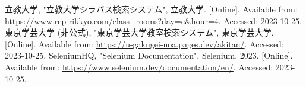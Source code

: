 \documentclass[11pt]{ujarticle}
\begin{document}
\begin{thebibliography}{99}
	立教大学, "立教大学シラバス検索システム", 立教大学. [Online]. Available from: \url{https://www.rep-rikkyo.com/class_rooms?day=c&hour=4}. Accessed: 2023-10-25.
	東京学芸大学 (非公式), "東京学芸大学教室検索システム", 東京学芸大学. [Online]. Available from: \url{https://u-gakugei-uoa.pages.dev/akitan/}. Accessed: 2023-10-25.
	SeleniumHQ, "Selenium Documentation", Selenium, 2023. [Online]. Available from: \url{https://www.selenium.dev/documentation/en/}. Accessed: 2023-10-25.
\end{thebibliography}
\end{document}
